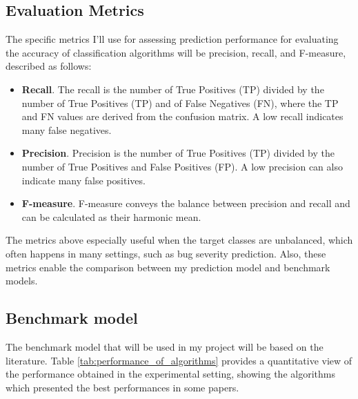 \documentclass[a4paper]{article}
\begin{document}
\subsection{Evaluation Metrics}
The specific metrics I'll use for assessing prediction performance for evaluating the accuracy of classification algorithms will be precision, recall, and F-measure, described as follows\cite{Kuhn:2013}:

\begin{itemize}
\item \textbf{Recall}. The recall is the number of True Positives (TP) divided by the number of True Positives (TP) and of False Negatives (FN), where the TP and FN values are derived from the confusion matrix. A low recall indicates many false negatives.

\item \textbf{Precision}. Precision is the number of True Positives (TP) divided by the number of True Positives and False Positives (FP). A low precision can also indicate many false positives.

\item \textbf{F-measure}. F-measure conveys the balance between precision and recall and can be calculated as their harmonic mean. 
\end{itemize}

The metrics above especially useful when the target classes are unbalanced, which often happens in many settings, such as bug severity prediction. Also, these metrics enable the comparison between my prediction model and benchmark models.

\subsection{Benchmark model}

The benchmark model that will be used in my project will be based on the literature. Table \ref{tab:performance_of_algorithms}  provides a quantitative view of the performance obtained in the experimental setting, showing the algorithms which presented the best performances in some papers. 
\end{document}
